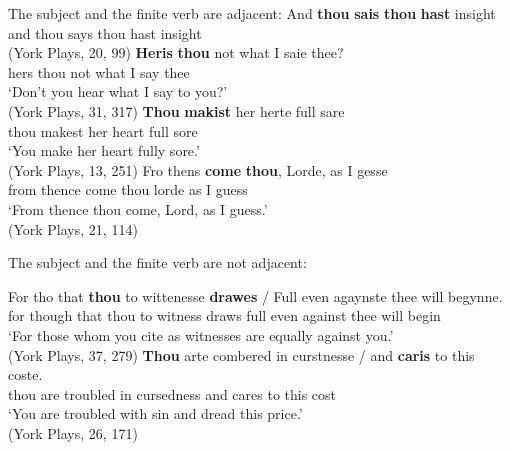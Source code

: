 \documentclass[output=paper]{langsci/langscibook}
\begin{document}
The subject and the finite verb are adjacent:
\ea
\ea \gll And \textbf{thou} \textbf{sais} \textbf{thou} \textbf{hast} insight\\
and thou says thou hast insight\\
\glt (York Plays, 20, 99)
\ex \gll \textbf{Heris} \textbf{thou} not what I saie thee?\\
hers thou not what I say thee\\
\glt ‘Don't you hear what I say to you?'\\
(York Plays, 31, 317)
\ex \gll \textbf{Thou} \textbf{makist} her herte full sare\\
thou makest her heart full sore\\
\glt ‘You make her heart fully sore.'\\
(York Plays, 13, 251)
\ex \gll Fro thens \textbf{come} \textbf{thou}, Lorde, as I gesse\\
from thence come thou lorde as I guess\\
\glt ‘From thence thou come, Lord, as I guess.'\\
(York Plays, 21, 114)
\z
\z

The subject and the finite verb are not adjacent:

\ea
\ea \gll For tho that \textbf{thou} to wittenesse \textbf{drawes} / Full even agaynste thee will begynne.\\
for though that thou to witness draws {} full even against thee will begin\\
\glt `For those whom you cite as witnesses are equally against you.'\\
\glt (York Plays, 37, 279)
\ex \gll \textbf{Thou} arte combered in curstnesse / and \textbf{caris} to this coste.\\
thou are troubled in cursedness {} and cares to this cost\\
\glt `You are troubled with sin and dread this price.'\\
\glt (York Plays, 26, 171)
\z
\z
\end{document}
